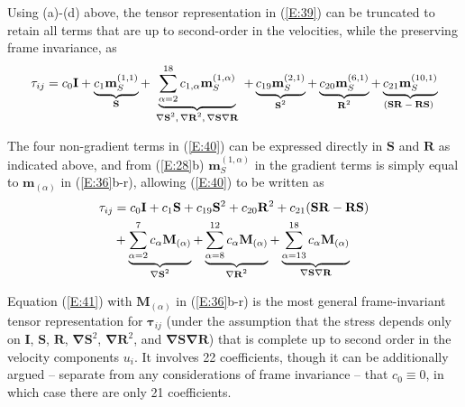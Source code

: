 Using (a)-(d) above, the tensor representation in (\ref{E:39}) can be truncated to retain all terms that are up to second-order in the velocities, while the preserving frame invariance, as
%
\begin{equation}
\label{E:41}
	\mathbf{\tau}_{ij} =  c_{0} \mathbf{I}
	+ \underbrace{
				c_{1} \mathbf{m}^{(1,1)}_{S}
				} %
				_{\text{\textbf{S}}}
	+ \underbrace{
				\sum_{\alpha=2}^{18} c_{1,\alpha} \mathbf{m}^{(1,\alpha)}_{S}
				 } %
				_{\text{ $ \mathbf{\nabla S}^{2}, \mathbf{\nabla R}^{2}, \mathbf{\nabla S \nabla R}$ }}
	+ \underbrace{
				c_{19} \mathbf{m}^{(2,1)}_{S}
				}%
				_{\text{ $\mathbf{S}^2$ }}
	+ \underbrace{
				c_{20} \mathbf{m}^{(6,1)}_{S}
				}%
				_{\text{ $\mathbf{R}^2$ }}
	+ \underbrace{
				c_{21} \mathbf{m}^{(10,1)}_{S}
				}%
				_{\text{$(\mathbf{SR-RS})$ }}
\end{equation}
%
%   

The four non-gradient terms in (\ref{E:40}) can be expressed directly in $\mathbf{S}$ and $\mathbf{R}$ as indicated above, and from (\ref{E:28}b)  $\mathbf{m}^{(1,\alpha)}_{S}$ in the gradient terms is simply equal to $\mathbf{m}_{(\alpha)}$ in (\ref{E:36}b-r), allowing (\ref{E:40}) to be written as
%
\begin{align}
\label{E:42}
	\mathbf{\tau}_{ij} &=  c_{0} \mathbf{I}
	+ c_{1} \mathbf{S}
	+ c_{19} \mathbf{S}^2
	+ c_{20} \mathbf{R}^2
	+ c_{21} (\mathbf{SR-RS}) \notag \\
	&+ \underbrace{
				\sum_{\alpha=2}^{7} c_{\alpha} \mathbf{M}_{(\alpha)}
				 } %
				_{\text{ $\mathbf{\nabla S}^2$ }}
	+ \underbrace{
				\sum_{\alpha=8}^{12} c_{\alpha} \mathbf{M}_{(\alpha)}
				 } %
				_{\text{ $\mathbf{\nabla R}^2$ }}
	+ \underbrace{
				\sum_{\alpha=13}^{18} c_{\alpha} \mathbf{M}_{(\alpha)}
				 } %
				_{\text{ $\mathbf{\nabla S \nabla R}$ }}
\end{align}
%
%   

Equation (\ref{E:41}) with $\mathbf{M}_{(\alpha)}$  in (\ref{E:36}b-r) is the most general frame-invariant tensor representation for $\mathbf{\tau}_{ij}$  (under the assumption that the stress depends only on $\mathbf{I}$, $\mathbf{S}$, $\mathbf{R}$, $\mathbf{\nabla S}^{2}$, $\mathbf{\nabla R}^{2}$, and $\mathbf{\nabla S \nabla R}$) that is complete up to second order in the velocity components  $u_i$.  It involves 22 coefficients, though it can be additionally argued – separate from any considerations of frame invariance – that $c_0 \equiv 0$, in which case there are only 21 coefficients. 

